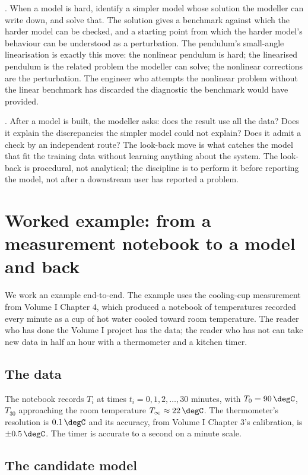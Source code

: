 . When a model is hard,
identify a simpler model whose solution the modeller can write
down, and solve that. The solution gives a benchmark against which
the harder model can be checked, and a starting point from which
the harder model's behaviour can be understood as a perturbation.
The pendulum's small-angle linearisation is exactly this move: the
nonlinear pendulum is hard; the linearised pendulum is the related
problem the modeller can solve; the nonlinear corrections are the
perturbation. The engineer who attempts the nonlinear problem
without the linear benchmark has discarded the diagnostic the
benchmark would have provided.

. After a model is built, the modeller asks:
does the result use all the data? Does it explain the
discrepancies the simpler model could not explain? Does it admit
a check by an independent route? The look-back move is what
catches the model that fit the training data without learning
anything about the system. The look-back is procedural, not
analytical; the discipline is to perform it before reporting the
model, not after a downstream user has reported a problem.

\section{Worked example: from a measurement notebook to a model and back}

We work an example end-to-end. The example uses the cooling-cup
measurement from Volume I Chapter 4, which produced a notebook of
temperatures recorded every minute as a cup of hot water cooled
toward room temperature. The reader who has done the Volume I
project has the data; the reader who has not can take new data in
half an hour with a thermometer and a kitchen timer.

\subsection{The data}

The notebook records $T_{i}$ at times $t_{i} = 0, 1, 2, \ldots, 30$
minutes, with $T_{0} = 90\,\degC$, $T_{30}$ approaching the room
temperature $T_{\infty} \approx 22\,\degC$. The thermometer's
resolution is $0.1\,\degC$ and its accuracy, from Volume I
Chapter 3's calibration, is $\pm 0.5\,\degC$. The timer is
accurate to a second on a minute scale.

\subsection{The candidate model}

